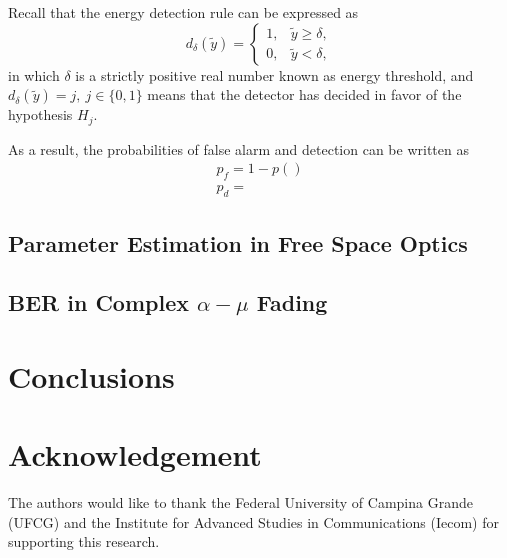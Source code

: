 \documentclass[conference, 10pt]{IEEEtran}
\begin{document}
Recall that the energy detection rule can be expressed as
\begin{equation}
    d_\delta (\tilde{y}) =
\left\{
    \begin{array}{ll}
        1, & \tilde{y} \geq \delta,\\
        0, & \tilde{y} < \delta,
    \end{array}
\right.
\end{equation}
in which $\delta$ is a strictly positive real number known as energy threshold,
and $d_\delta (\tilde{y}) = j,~j \in \{0,1\}$ means that the detector has decided
in favor of the hypothesis $H_j$.

As a result, the probabilities of false alarm and detection can
be written as
\begin{align}
    p_f = 1 - p()\\
    p_d =
\end{align}

\subsection{Parameter Estimation in Free Space Optics}

\subsection{BER in Complex $\alpha-\mu$ Fading}

\section{Conclusions}

\section*{Acknowledgement}
The authors would like to thank the Federal University of Campina Grande (UFCG)
and the Institute for Advanced Studies in Communications (Iecom) for supporting
this research.



\end{document}
